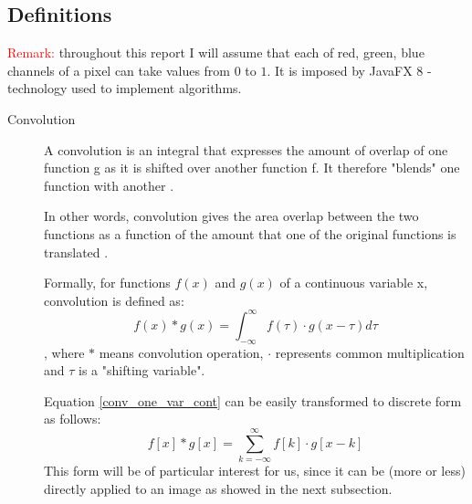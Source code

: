 \documentclass{article}
\begin{document}
\subsection{Definitions}
\label{definitions}
\textcolor{red}{Remark:} throughout this report I will assume that each of red, green, blue channels of a pixel can take values from $0$ to $1$. It is imposed by JavaFX 8 - technology used to implement algorithms.

\begin{description}
\item[Convolution]
A convolution is an integral that expresses the amount of overlap of one function g as it is shifted over another function f. It therefore "blends" one function with another  \cite{convolution_wolphram}. 

In other words, convolution gives the area overlap between the two functions as a function of the amount that one of the original functions is translated \cite{convolution_wiki}.

Formally, for functions $f(x)$ and $g(x)$ of a continuous variable x, convolution is defined as:
\begin{equation} \label{conv_one_var_cont}
f(x) * g(x) = \int_{-\infty}^{\infty} f(\tau) \cdot g(x - \tau) d\tau
\end{equation}
, where $*$ means convolution operation, $\cdot$ represents common multiplication and $\tau$ is a "shifting variable".

Equation \ref{conv_one_var_cont} can be easily transformed to discrete form as follows:
\begin{equation} \label{conv_one_var_disc}
f[x] * g[x] = \sum_{k=-\infty}^{\infty} f[k] \cdot g[x-k]
\end{equation}
This form will be of particular interest for us, since it can be (more or less) directly applied to an image as showed in the next subsection.


\end{description}
\end{document}
